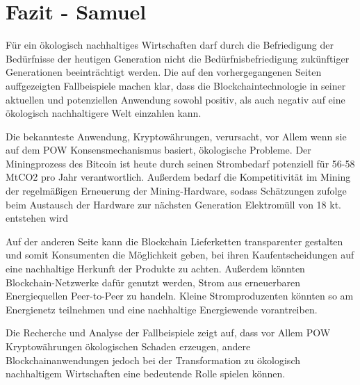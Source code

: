 \chapter{Fazit - Samuel }
Für ein ökologisch nachhaltiges Wirtschaften darf durch die Befriedigung der Bedürfnisse der heutigen Generation nicht die Bedürfnisbefriedigung zukünftiger Generationen beeinträchtigt werden. Die auf den vorhergegangenen Seiten auffgezeigten Fallbeispiele machen klar, dass die Blockchaintechnologie in seiner aktuellen und potenziellen Anwendung sowohl positiv, als auch negativ auf eine ökologisch nachhaltigere Welt einzahlen kann.

Die bekannteste Anwendung, Kryptowährungen, verursacht, vor Allem wenn sie auf dem POW Konsensmechanismus basiert, ökologische Probleme. Der Miningprozess des Bitcoin ist heute durch seinen Strombedarf potenziell für 56-58 MtCO2 pro Jahr verantwortlich. Außerdem bedarf die Kompetitivität im Mining der regelmäßigen Erneuerung der Mining-Hardware, sodass Schätzungen zufolge beim Austausch der Hardware zur nächsten Generation Elektromüll von 18 kt. entstehen wird

Auf der anderen Seite kann die Blockchain Lieferketten transparenter gestalten und somit Konsumenten die Möglichkeit geben, bei ihren Kaufentscheidungen auf eine nachhaltige Herkunft der Produkte zu achten. Außerdem könnten Blockchain-Netzwerke dafür genutzt werden, Strom aus erneuerbaren Energiequellen Peer-to-Peer zu handeln. Kleine Stromproduzenten könnten so am Energienetz teilnehmen und eine nachhaltige Energiewende vorantreiben.

Die Recherche und Analyse der Fallbeispiele zeigt auf, dass vor Allem POW Kryptowährungen ökologischen Schaden erzeugen, andere Blockchainanwendungen jedoch bei der Transformation zu ökologisch nachhaltigem Wirtschaften eine bedeutende Rolle spielen können.



